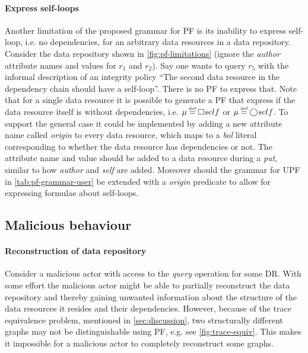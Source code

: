 \paragraph{Express self-loops} Another limitation of the proposed grammar for PF is its inability to express self-loop, i.e. no dependencies, for an arbitrary data resources in a data repository. Consider the data repository shown in \autoref{fig:pf-limitations} (ignore the \emph{author} attribute names and values for $r_1$ and $r_2$). Say one wants to query $r_5$ with the informal description of an integrity policy ``The second data resource in the dependency chain should have a self-loop''. There is no PF to express that. Note that for a single data resource it is possible to generate a PF that express if the data resource itself is without dependencies, i.e. $\inte \eqdef \G self$ or $\inte \eqdef \X self$. To support the general case it could be implemented by adding a new attribute name called \emph{origin} to every data resource, which maps to a \emph{bol} literal corresponding to whether the data resource has dependencies or not. The attribute name and value should be added to a data resource during a \emph{put}, similar to how \emph{author} and \emph{self} are added. Moreover should the grammar for UPF in \autoref{tab:pf-grammar-user} be extended with a \emph{origin} predicate to allow for expressing formulae about self-loops.

\subsection{Malicious behaviour}
\paragraph{Reconstruction of data repository}
Consider a malicious actor with access to the \emph{query} operation for some DR. With some effort the malicious actor might be able to partially reconstruct the data repository and thereby gaining unwanted information about the structure of the data resources it resides and their dependencies. However, because of the trace equivalence problem, mentioned in \autoref{sec:discussion}, two structurally different graphs may not be distinguishable using PF, e.g. see \autoref{fig:trace-equiv}. This makes it impossible for a malicious actor to completely reconstruct some graphs.

